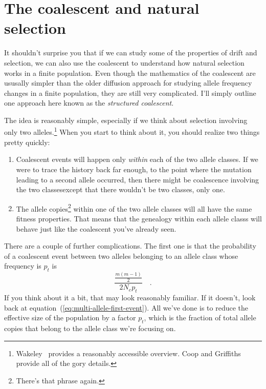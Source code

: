 \documentclass[12pt]{article}
\begin{document}
\section*{The coalescent and natural selection}

It shouldn't surprise you that if we can study some of the properties
of drift and selection, we can also use the coalescent to understand
how natural selection works in a finite population. Even though the
mathematics of the coalescent are ususally simpler than the older
diffusion approach for studying allele frequency changes in a finite
population, they are still very complicated. I'll simply outline one
approach here known as the {\it structured
  coalescent}. 

The idea is reasonably simple, especially if we think about selection
involving only two alleles.\footnote{Wakeley~\cite{Wakeley-2010}
  provides a reasonably accessible overview. Coop and
  Griffiths~\cite{Coop-Griffiths-2004} provide all of the gory
  details.} When you start to think about it, you should realize two
things pretty quickly:

\begin{enumerate}

  \item Coalescent events will happen only {\it within} each of the
    two allele classes. If we were to trace the history back far
    enough, to the point where the mutation leading to a second allele
    occurred, then there might be coalescence involving the two
    classes{\dash}except that there wouldn't be two classes, only
    one.

  \item The allele copies\footnote{There's that phrase again.} within
    one of the two allele classes will all have the same fitness
    properties. That means that the genealogy within each allele
    classs will behave just like the coalescent you've already seen.
    
 \end{enumerate}
There are a couple of further complications. The first one is that the
probability of a coalescent event between two alleles belonging to an
allele class whose frequency is $p_t$ is
\[
 \frac{\frac{m(m-1)}{2}}{2N_ep_t} \quad .
 \]
If you think about it a bit, that may look reasonably familiar. If it
doesn't, look back at equation~(\ref{eq:multi-allele-first-event}). All
we've done is to reduce the effective size of the population by a
factor $p_t$, which is the fraction of total allele copies that belong
to the allele class we're focusing on.
\end{document}

